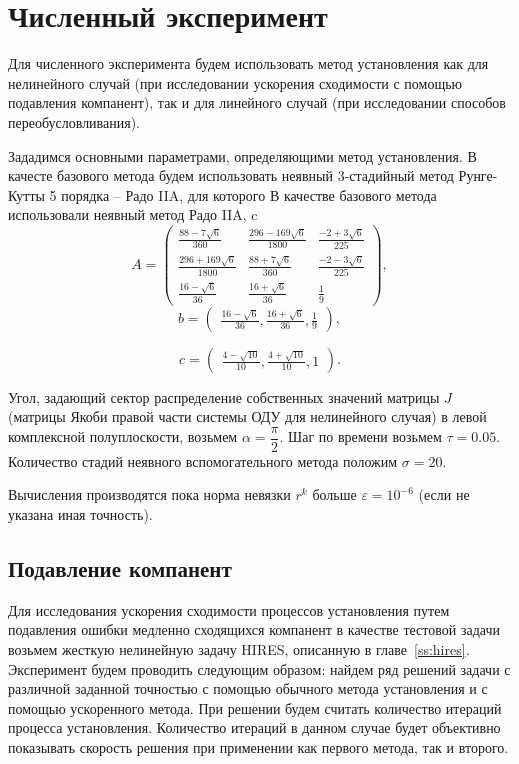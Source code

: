 \documentclass[a4paper,14pt]{extreport}
\begin{document}
  
  \chapter{Численный эксперимент}
  \label{c:numer_ex} 
  Для численного эксперимента будем использовать метод установления как для нелинейного случай (при исследовании ускорения сходимости с помощью подавления компанент), так и для линейного случай (при исследовании способов переобусловливания).
  
  Зададимся основными параметрами, определяющими метод установления. В качесте базового метода будем использовать неявный 3-стадийный метод Рунге-Кутты 5 порядка -- Радо IIA, для которого
   В качестве базового метода использовали неявный метод Радо IIA, c
$$A=\left(
\begin{array}{lll}
 \frac{88-7\sqrt{6}}{360} & \frac{296-169\sqrt{6}}{1800} & \frac{-2+3\sqrt{6}}{225} \\
 \frac{296+169\sqrt{6}}{1800} & \frac{88+7\sqrt{6}}{360} & \frac{-2-3\sqrt{6}}{225} \\
 \frac{16-\sqrt{6}}{36} &\frac{16+\sqrt{6}}{36} & \frac{1}{9}
\end{array}
\right),$$
$$b=\left(
\begin{array}{l}
\frac{16-\sqrt{6}}{36},\frac{16+\sqrt{6}}{36},\frac{1}{9}
\end{array}
\right),$$

$$c=\left(
\begin{array}{l}
\frac{4-\sqrt{10}}{10},
\frac{4+\sqrt{10}}{10},
1
\end{array}
\right).$$

Угол, задающий сектор распределение собственных значений матрицы $J$ (матрицы Якоби правой части системы ОДУ для нелинейного случая) в левой комплексной полуплоскости, возьмем $\alpha = \dfrac{\pi}{2}$.
Шаг по времени возьмем $\tau = 0.05$. Количество стадий неявного вспомогательного метода положим $\sigma = 20$.

Вычисления производятся пока норма невязки $r^k$ больше $\varepsilon = 10^{-6}$ (если не указана иная точность).
 
  
  \section{Подавление компанент}
  \label{s:test_opression}
  
  Для исследования ускорения сходимости процессов установления путем подавления ошибки медленно сходящихся компанент в качестве тестовой задачи возьмем жесткую нелинейную задачу HIRES, описанную в главе~\ref{ss:hires}. Эксперимент будем проводить следующим образом: найдем ряд решений задачи с различной заданной точностью с помощью обычного метода установления и с помощью ускоренного метода. При решении будем считать количество итераций процесса установления. Количество итераций в данном случае будет объективно показывать скорость решения при применении как первого метода, так и второго.
  
\end{document}
